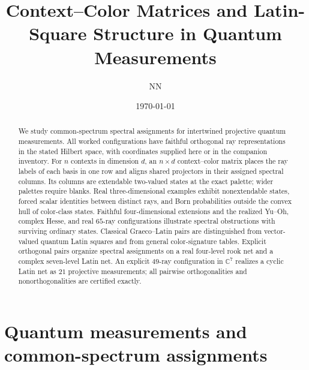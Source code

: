 \documentclass[aps,pra,reprint,superscriptaddress,longbibliography,nofootinbib,floatfix,10pt]{revtex4-2}
\theoremstyle{definition}\newtheorem{definition}[theorem]{Definition}
\theoremstyle{remark}\newtheorem{remark}[theorem]{Remark}
\begin{document}
\title{Context--Color Matrices and Latin-Square Structure in Quantum Measurements}

\author{NN}

\date{\today}



\begin{abstract}
We study common-spectrum spectral assignments for intertwined projective quantum measurements. All worked configurations have faithful orthogonal ray representations in the stated Hilbert space, with coordinates supplied here or in the companion inventory. For $n$ contexts in dimension $d$, an $n\times d$ context--color matrix places the ray labels of each basis in one row and aligns shared projectors in their assigned spectral columns. Its columns are extendable two-valued states at the exact palette; wider palettes require blanks. Real three-dimensional examples exhibit nonextendable states, forced scalar identities between distinct rays, and Born probabilities outside the convex hull of color-class states. Faithful four-dimensional extensions and the realized Yu--Oh, complex Hesse, and real $65$-ray configurations illustrate spectral obstructions with surviving ordinary states. Classical Graeco--Latin pairs are distinguished from vector-valued quantum Latin squares and from general color-signature tables. Explicit orthogonal pairs organize spectral assignments on a real four-level rook net and a complex seven-level Latin net. An explicit $49$-ray configuration in $\mathbb C^7$ realizes a cyclic Latin net as $21$ projective measurements; all pairwise orthogonalities and nonorthogonalities are certified exactly.
\end{abstract}
\maketitle



\section{Quantum measurements and common-spectrum assignments}\label{sec:intro}
\end{document}
